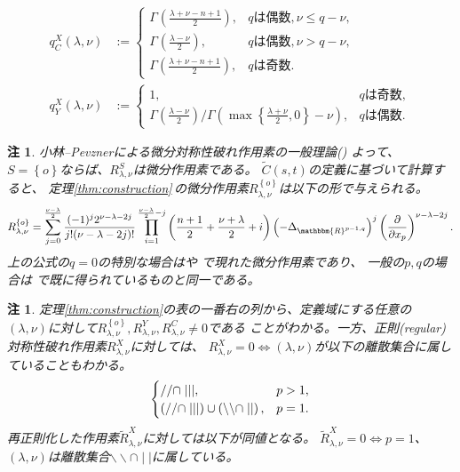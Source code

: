\documentclass[12pt]{article} %
\newcommand{\tisevenjap}{\mbox{は偶数}}
\newcommand{\tisoddjap}{\mbox{は奇数}}
\newtheorem{remark}[theorem]{注}
\theoremstyle{definition}
\theoremstyle{exampstyle} \newtheorem{examp}[theorem]{Theorem}
\newcommand{\doubt}[1]{\uwave{#1}}
\begin{document}
\begin{align*}
 q_C^X (\lambda, \nu) &:= \left\{ \begin{array}{ll}
     \Gamma^{} \left( \frac{\lambda + \nu - n + 1}{2} \right), & q\tisevenjap
     , \nu \leqslant q - \nu,\\
     \Gamma^{} \left( \frac{\lambda - \nu}{2} \right), & q\tisevenjap,
     \nu > q - \nu,\\
     \Gamma \left( \frac{\lambda + \nu - n + 1}{2} \right), & q\tisoddjap
     .
   \end{array} \right.\\
q_Y^X (\lambda, \nu) &:= \left\{ \begin{array}{ll}
     1, & 
      q \tisoddjap,\\
      \Gamma \left( \frac{\lambda -
     \nu}{2} \right) / \Gamma \left( \max \left\{ \frac{\lambda + \nu}{2}, 0
     \right\} - \nu \right), & q
     \tisevenjap.
   \end{array} \right.
\end{align*}
\begin{remark}
	小林--Pevznerによる微分対称性破れ作用素の一般理論(\cite[Chap.\ 2]{kobayashi2016differential1})
	よって、
	$S=\left\{ o \right\}$ならば、$R_{\lambda,\nu}^S$は微分作用素である。
	$\tilde{C}(s,t)$の定義に基づいて計算すると、
	定理\ref{thm:construction}\,の微分作用素$R_{\lambda,\nu}^{ \left\{ o \right\}}$は以下の形で与えられる。
	\begin{equation*}
		R_{\lambda,\nu}^{ \left\{ o \right\}}=
		\sum_{j=0}^{\frac{\nu-\lambda}{2}}\frac{(-1)^j2^{\nu-\lambda-2j}}{j!(\nu-\lambda-2j)!}\prod_{i=1}^{\frac{\nu-\lambda}{2}-j}\left( \frac{n
		+1}{2}+\frac{\nu+\lambda}{2}
		+i \right)\left(- \Delta_{\mathbbm{R}^{p-1,q}} \right)^j\left( \frac{\partial}{\partial x_p} \right)^{\nu-\lambda-2j}.
	\end{equation*}
	上の公式の$q=0$の特別な場合は\cite[Thms. 5.1.1 and 5.2.1]{juhl2009families}や\cite[(10.1)]{kobayashi2015symmetry}
	で現れた微分作用素であり、
	一般の$p,q$の場合は
	\cite[Thm.\ 4.3]{kobayashi2015branching}で既に得られているものと同一である。
\end{remark}
\begin{remark}\label{rmk:thm:construction}
	定理\ref{thm:construction}\;の表の一番右の列から、定義域に\doubt{属}する任意の
	$(\lambda,\nu)$に対して$R_{\lambda,\nu}^{ \left\{ o \right\}},R_{\lambda,\nu}^Y,R_{\lambda,\nu}^C\neq0$である
	ことがわかる。一方、正則(regular)対称性破れ作用素$R_{\lambda,\nu}^X$に対しては、
	$R^X_{\lambda,\nu}=0\iff(\lambda,\nu)$が以下の離散集合に属していることもわかる。
	\[\begin{cases}
			//\cap\mid\mid\mid,&p>1,\\
			\left(//\cap\mid\mid\mid\right) \cup \left(\backslash\backslash\cap\mid\mid\right),&p=1.
		\end{cases}
	\]
	再正則化した作用素$\tilde{R}_{\lambda,\nu}^X$に対しては\doubt{、}以下が同値となる。
	$\tilde{R}_{\lambda,\nu}^X=0\iff p=1$、$(\lambda,\nu)$は離散集合$\backslash\backslash\cap \mid\mid$に属している。
\end{remark}
\end{document}
